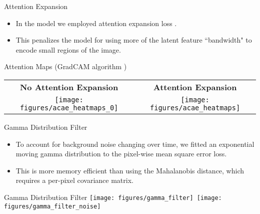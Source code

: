 \documentclass[10pt,handout]{beamer}
\begin{document}
\begin{frame}{Attention Expansion}

\begin{itemize}
\item In the model we employed \alert{attention expansion loss} \cite{attention_anomalies}.

\item This penalizes the model for using more of the latent feature ``bandwidth" to encode small regions of the image.\\[0.5cm]
\end{itemize}

\begin{exampleblock}{Attention Maps (GradCAM algorithm \cite{grad_cam})}
~\\[2mm]
\begin{tabular}{c | c}
\textbf{No Attention Expansion} & \textbf{Attention Expansion}\\
\texttt{[image: figures/acae\_heatmaps\_0]} & \texttt{[image: figures/acae\_heatmaps]}
\end{tabular}
\end{exampleblock}
\end{frame}

\begin{frame}{Gamma Distribution Filter}

\begin{itemize}
\item To account for background noise changing over time, we fitted an \alert{exponential moving gamma distribution} to the pixel-wise mean square error loss.

\item This is more memory efficient than using the Mahalanobis distance, which requires a per-pixel covariance matrix.\\[0.5cm]
\end{itemize}
\pause
\begin{exampleblock}{Gamma Distribution Filter}
\texttt{[image: figures/gamma\_filter]}~\texttt{[image: figures/gamma\_filter\_noise]}
\end{exampleblock}
\end{frame}
\end{document}
